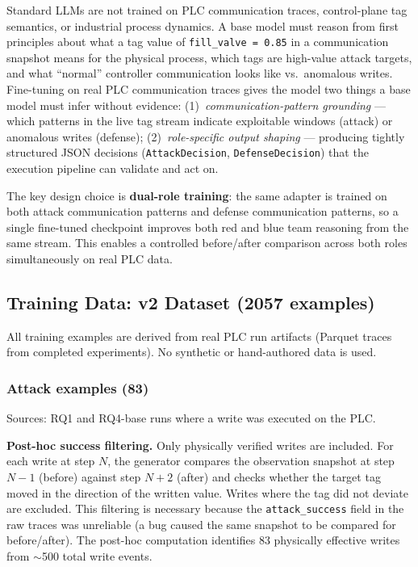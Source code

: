 \documentclass[11pt]{article}
\begin{document}
Standard LLMs are not trained on PLC communication traces, control-plane tag semantics, or industrial process dynamics. A base model must reason from first principles about what a tag value of \texttt{fill\_valve = 0.85} in a communication snapshot means for the physical process, which tags are high-value attack targets, and what ``normal'' controller communication looks like vs.\ anomalous writes. Fine-tuning on real PLC communication traces gives the model two things a base model must infer without evidence: (1)~\emph{communication-pattern grounding} --- which patterns in the live tag stream indicate exploitable windows (attack) or anomalous writes (defense); (2)~\emph{role-specific output shaping} --- producing tightly structured JSON decisions (\texttt{AttackDecision}, \texttt{DefenseDecision}) that the execution pipeline can validate and act on.

The key design choice is \textbf{dual-role training}: the same adapter is trained on both attack communication patterns and defense communication patterns, so a single fine-tuned checkpoint improves both red and blue team reasoning from the same stream. This enables a controlled before/after comparison across both roles simultaneously on real PLC data.

\subsection*{Training Data: v2 Dataset (2057 examples)}

All training examples are derived from real PLC run artifacts (Parquet traces from completed experiments). No synthetic or hand-authored data is used.

\subsubsection*{Attack examples (83)}

Sources: RQ1 and RQ4-base runs where a write was executed on the PLC.

\textbf{Post-hoc success filtering.} Only physically verified writes are included. For each write at step $N$, the generator compares the observation snapshot at step $N{-}1$ (before) against step $N{+}2$ (after) and checks whether the target tag moved in the direction of the written value. Writes where the tag did not deviate are excluded. This filtering is necessary because the \texttt{attack\_success} field in the raw traces was unreliable (a bug caused the same snapshot to be compared for before/after). The post-hoc computation identifies 83 physically effective writes from $\sim$500 total write events.
\end{document}

